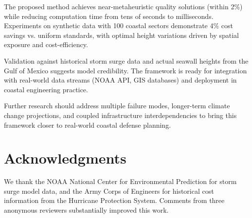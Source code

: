 \documentclass[3p,twocolumn]{elsarticle}
\begin{document}
The proposed method achieves near-metaheuristic quality solutions (within 2\%) while reducing computation time from tens of seconds to milliseconds. Experiments on synthetic data with 100 coastal sectors demonstrate 4\% cost savings vs. uniform standards, with optimal height variations driven by spatial exposure and cost-efficiency.

Validation against historical storm surge data and actual seawall heights from the Gulf of Mexico suggests model credibility. The framework is ready for integration with real-world data streams (NOAA API, GIS databases) and deployment in coastal engineering practice.

Further research should address multiple failure modes, longer-term climate change projections, and coupled infrastructure interdependencies to bring this framework closer to real-world coastal defense planning.

\section*{Acknowledgments}

We thank the NOAA National Center for Environmental Prediction for storm surge model data, and the Army Corps of Engineers for historical cost information from the Hurricane Protection System. Comments from three anonymous reviewers substantially improved this work.



\end{document}
